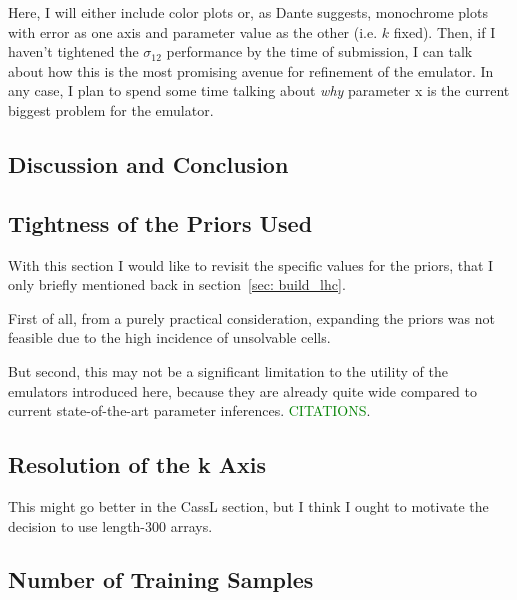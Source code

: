 \documentclass[11pt]{article}
\begin{document}
Here, I will either include color plots or, as Dante suggests, monochrome plots with error as one axis and parameter value as the other (i.e. $k$ fixed). Then, if I haven't tightened the $\sigma_{12}$ performance by the time of submission, I can talk about how this is the most promising avenue for refinement of the emulator. In any case, I plan to spend some time talking about \textit{why} parameter x is the current biggest problem for the emulator. 

\begin{centering}
\section{Discussion and Conclusion}
\end{centering}

\begin{centering}
\subsection{Tightness of the Priors Used}
\label{sec: priors}
\end{centering}

With this section I would like to revisit the specific values for the priors,
that I only briefly mentioned back in section~\ref{sec: build_lhc}.

First of all, from a purely practical consideration, expanding the priors was
not feasible due to the high incidence of unsolvable cells.

But second, this may not be a significant limitation to the utility of the
emulators introduced here, because they are already quite wide compared to
current state-of-the-art parameter inferences. \textcolor{green}{CITATIONS}.

\begin{centering}
\subsection{Resolution of the k Axis}
\end{centering}

This might go better in the CassL section, but I think I ought to motivate the decision to use length-300 arrays.

\begin{centering}
\subsection{Number of Training Samples}
\end{centering}
\end{document}
